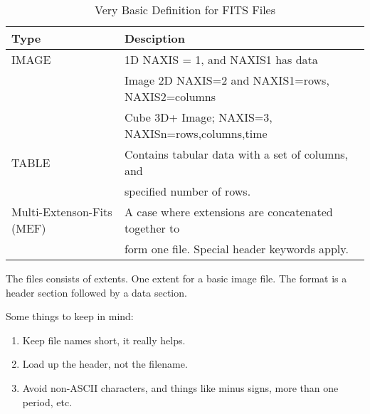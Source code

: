 \begin{table}[h!]
\centering
\begin{tabular}{| l | l |}
\hline
Type  & Desciption   \\
\hline
IMAGE                     & 1D NAXIS = 1, and NAXIS1 has data    \\ 
                          & Image 2D NAXIS=2 and NAXIS1=rows, NAXIS2=columns    \\ 
                          & Cube 3D+ Image; NAXIS=3, NAXISn=rows,columns,time    \\ 
TABLE                     & Contains tabular data with a set of columns, and    \\ 
                          & specified number of rows.    \\ 
Multi-Extenson-Fits (MEF) & A case where extensions are concatenated together to    \\ 
                          & form one file. Special header keywords apply.    \\ 
\hline
\end{tabular}
\caption[FITS Types]{Very Basic Definition for FITS Files}
\label{table:VeryBasicDefinitionforFITSFiles}
\end{table}

The files consists of extents. One extent for a basic image file.
The format is a header section followed by a data section.




Some things to keep in mind:

\vspace{-.15cm}
\begin{enumerate}\addtolength{\itemsep}{-0.5\baselineskip}
   \item  Keep file names short, it really helps. 
   \item  Load up the header, not the filename.
   \item  Avoid non-ASCII characters, and things like minus signs, more than one period,
etc. 
\end{enumerate}


